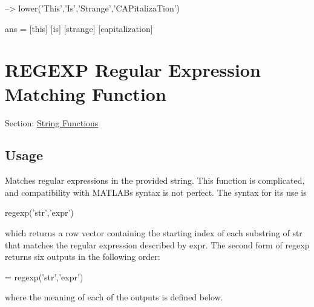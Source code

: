 \begin{DoxyVerbInclude}
--> lower({'This','Is','Strange','CAPitalizaTion'})

ans = 
 [this] [is] [strange] [capitalization] 
\end{DoxyVerbInclude}
 \hypertarget{string_regexp}{}\section{R\-E\-G\-E\-X\-P Regular Expression Matching Function}\label{string_regexp}
Section\-: \hyperlink{sec_string}{String Functions} \hypertarget{vtkwidgets_vtkxyplotwidget_Usage}{}\subsection{Usage}\label{vtkwidgets_vtkxyplotwidget_Usage}
Matches regular expressions in the provided string. This function is complicated, and compatibility with M\-A\-T\-L\-A\-Bs syntax is not perfect. The syntax for its use is \begin{DoxyVerb}  regexp('str','expr')
\end{DoxyVerb}
 which returns a row vector containing the starting index of each substring of {\ttfamily str} that matches the regular expression described by {\ttfamily expr}. The second form of {\ttfamily regexp} returns six outputs in the following order\-: \begin{DoxyVerb}   = regexp('str','expr')
\end{DoxyVerb}
 where the meaning of each of the outputs is defined below. 
